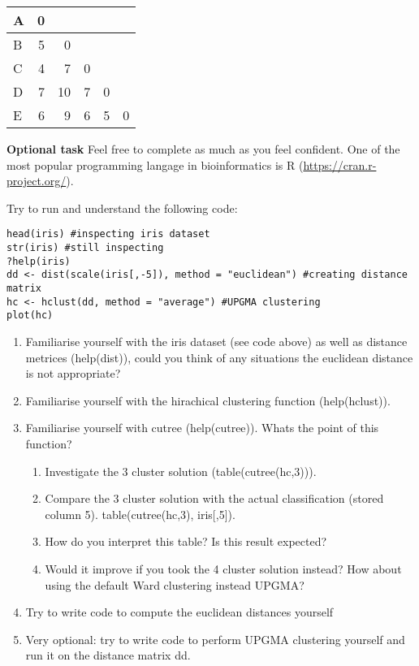 \documentclass[11pt,runningheads,a4paper]{article}
\begin{document}
\begin{enumerate}
\begin{table}[H]
\begin{tabular}{|l|r|r|r|l|l|}
		A & 0 & \multicolumn{1}{l|}{} & \multicolumn{1}{l|}{} &  &  \\ \hline
		B & 5 & 0 & \multicolumn{1}{l|}{} &  &  \\ \hline
		C & 4 & 7 & 0 &  &  \\ \hline
		D & 7 & 10 & 7 & \multicolumn{1}{r|}{0} &  \\ \hline
		E & 6 & 9 & 6 & \multicolumn{1}{r|}{5} & \multicolumn{1}{r|}{0} \\ \hline
		\end{tabular}
		\label{}
		\end{table}
\end{enumerate}

\textbf{Optional task} Feel free to complete as much as you feel confident. 
One of the most popular programming langage in bioinformatics is R (\url{https://cran.r-project.org/}).

Try to run and understand the following code:

\begin{verbatim}
head(iris) #inspecting iris dataset
str(iris) #still inspecting
?help(iris)
dd <- dist(scale(iris[,-5]), method = "euclidean") #creating distance matrix
hc <- hclust(dd, method = "average") #UPGMA clustering
plot(hc)
\end{verbatim}

\begin{enumerate}
\item Familiarise yourself with the iris dataset (see code above) as well as distance metrices (help(dist)), could you think of any situations the euclidean distance is not appropriate?
\item Familiarise yourself with the hirachical clustering function (help(hclust)).
\item Familiarise yourself with cutree (help(cutree)). Whats the point of this function? 

\begin{enumerate}
\item Investigate the 3 cluster solution (table(cutree(hc,3))).
\item Compare the 3 cluster solution with the actual classification (stored column 5). table(cutree(hc,3), iris[,5]). 
\item How do you interpret this table? Is this result expected? 
\item Would it improve if you took the 4 cluster solution instead? How about using the default Ward clustering instead UPGMA?
\end{enumerate}

\item Try to write code to compute the euclidean distances yourself
\item Very optional: try to write code to perform UPGMA clustering yourself and run it on the distance matrix dd.
\end{enumerate}
\end{document}
